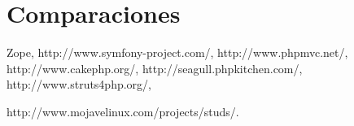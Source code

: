\section{Comparaciones}
Zope, http://www.symfony-project.com/,
http://www.phpmvc.net/, http://www.cakephp.org/,
http://seagull.phpkitchen.com/, http://www.struts4php.org/,

http://www.mojavelinux.com/projects/studs/.
